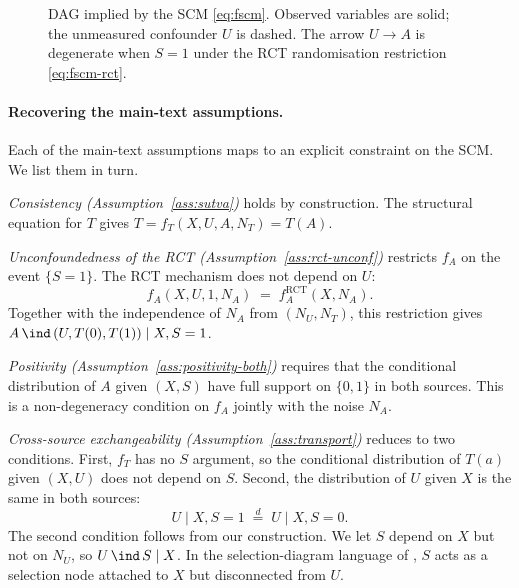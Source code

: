 \begin{figure}[tb]
\centering
{}
\caption{DAG implied by the SCM \eqref{eq:fscm}. Observed variables are solid; the unmeasured confounder $U$ is dashed. The arrow $U \to A$ is degenerate when $S = 1$ under the RCT randomisation restriction \eqref{eq:fscm-rct}.}
\label{fig:scm-dag}
\end{figure}

\paragraph{Recovering the main-text assumptions.}
Each of the main-text assumptions maps to an explicit constraint on the SCM.
We list them in turn.

\emph{Consistency (Assumption~\ref{ass:sutva})} holds by construction.
The structural equation for $T$ gives $T = f_T(X, U, A, N_T) = T(A)$.

\emph{Unconfoundedness of the RCT (Assumption~\ref{ass:rct-unconf})} restricts $f_A$ on the event $\{S = 1\}$.
The RCT mechanism does not depend on $U$:
\begin{equation}
f_A(X, U, 1, N_A) \;=\; f_A^{\mathrm{RCT}}(X, N_A).
\label{eq:fscm-rct}
\end{equation}
Together with the independence of $N_A$ from $(N_U, N_T)$, this restriction gives $A \,\ind\, (U, T(0), T(1)) \mid X, S = 1$.

\emph{Positivity (Assumption~\ref{ass:positivity-both})} requires that the conditional distribution of $A$ given $(X, S)$ have full support on $\{0, 1\}$ in both sources.
This is a non-degeneracy condition on $f_A$ jointly with the noise $N_A$.

\emph{Cross-source exchangeability (Assumption~\ref{ass:transport})} reduces to two conditions.
First, $f_T$ has no $S$ argument, so the conditional distribution of $T(a)$ given $(X, U)$ does not depend on $S$.
Second, the distribution of $U$ given $X$ is the same in both sources:
\begin{equation}
U \mid X, S = 1 \;\overset{d}{=}\; U \mid X, S = 0.
\label{eq:fscm-uxs}
\end{equation}
The second condition follows from our construction.
We let $S$ depend on $X$ but not on $N_U$, so $U \,\ind\, S \mid X$.
In the selection-diagram language of \citet{bareinboim2016causal}, $S$ acts as a selection node attached to $X$ but disconnected from $U$.

